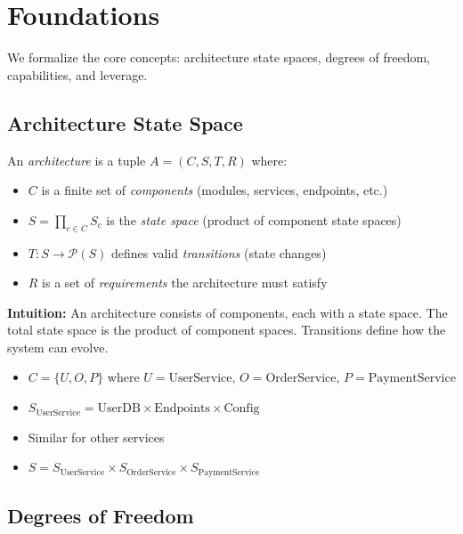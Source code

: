 \section{Foundations}\label{foundations}

We formalize the core concepts: architecture state spaces, degrees of freedom, capabilities, and leverage.

\subsection{Architecture State Space}

\begin{definition}[Architecture]\label{def:architecture}
An \emph{architecture} is a tuple $A = (C, S, T, R)$ where:
\begin{itemize}
\item $C$ is a finite set of \emph{components} (modules, services, endpoints, etc.)
\item $S = \prod_{c \in C} S_c$ is the \emph{state space} (product of component state spaces)
\item $T : S \to \mathcal{P}(S)$ defines valid \emph{transitions} (state changes)
\item $R$ is a set of \emph{requirements} the architecture must satisfy
\end{itemize}
\end{definition}

\textbf{Intuition:} An architecture consists of components, each with a state space. The total state space is the product of component spaces. Transitions define how the system can evolve.

\begin{example}
\begin{itemize}
\item $C = \{U, O, P\}$ where
  $U=\text{UserService}$,
  $O=\text{OrderService}$,
  $P=\text{PaymentService}$
\item $S_{\text{UserService}} = \text{UserDB} \times \text{Endpoints} \times \text{Config}$
\item Similar for other services
\item $S = S_{\text{UserService}} \times S_{\text{OrderService}} \times S_{\text{PaymentService}}$
\end{itemize}
\end{example}

\subsection{Degrees of Freedom}

